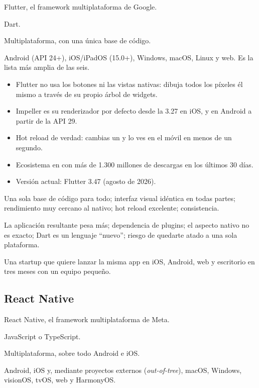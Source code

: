  Flutter, el framework multiplataforma de Google.

 Dart.

 Multiplataforma, con una única base de código.

 Android (API 24+), iOS/iPadOS (15.0+), Windows, macOS, Linux y web. Es la lista más amplia de las seis.

\begin{itemize}[leftmargin=*,itemsep=0.2em,topsep=0.2em]
  \item Flutter no usa los botones ni las vistas nativas: dibuja todos los píxeles él mismo a través de su propio árbol de widgets.
  \item Impeller es su renderizador por defecto desde la 3.27 en iOS, y en Android a partir de la API 29.
  \item Hot reload de verdad: cambias un  y lo ves en el móvil en menos de un segundo.
  \item Ecosistema en  con más de 1.300 millones de descargas en los últimos 30 días.
  \item Versión actual: Flutter 3.47 (agosto de 2026).
\end{itemize}

 Una sola base de código para todo; interfaz visual idéntica en todas partes; rendimiento muy cercano al nativo; hot reload excelente; consistencia.

 La aplicación resultante pesa más; dependencia de plugins; el aspecto nativo no es exacto; Dart es un lenguaje \enquote{nuevo}; riesgo de quedarte atado a una sola plataforma.

 Una startup que quiere lanzar la misma app en iOS, Android, web y escritorio en tres meses con un equipo pequeño.

\subsection{React Native}

 React Native, el framework multiplataforma de Meta.

 JavaScript o TypeScript.

 Multiplataforma, sobre todo Android e iOS.

 Android, iOS y, mediante proyectos externos (\emph{out-of-tree}), macOS, Windows, visionOS, tvOS, web y HarmonyOS.

